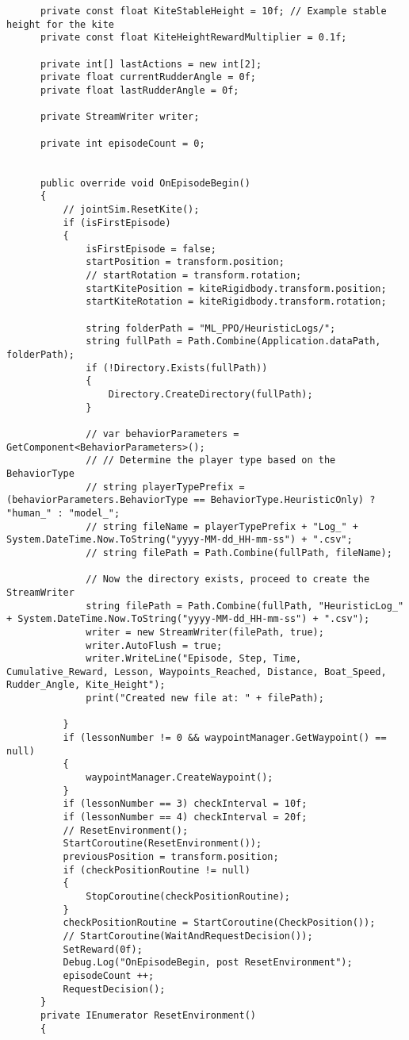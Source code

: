 \begin{lstlisting}
      private const float KiteStableHeight = 10f; // Example stable height for the kite
      private const float KiteHeightRewardMultiplier = 0.1f;
  
      private int[] lastActions = new int[2];
      private float currentRudderAngle = 0f;
      private float lastRudderAngle = 0f;
  
      private StreamWriter writer;
  
      private int episodeCount = 0;
  
  
      public override void OnEpisodeBegin()
      {
          // jointSim.ResetKite();
          if (isFirstEpisode)
          {
              isFirstEpisode = false;
              startPosition = transform.position;
              // startRotation = transform.rotation;
              startKitePosition = kiteRigidbody.transform.position;
              startKiteRotation = kiteRigidbody.transform.rotation;
  
              string folderPath = "ML_PPO/HeuristicLogs/";
              string fullPath = Path.Combine(Application.dataPath, folderPath);
              if (!Directory.Exists(fullPath))
              {
                  Directory.CreateDirectory(fullPath);
              }
  
              // var behaviorParameters = GetComponent<BehaviorParameters>();
              // // Determine the player type based on the BehaviorType
              // string playerTypePrefix = (behaviorParameters.BehaviorType == BehaviorType.HeuristicOnly) ? "human_" : "model_";
              // string fileName = playerTypePrefix + "Log_" + System.DateTime.Now.ToString("yyyy-MM-dd_HH-mm-ss") + ".csv";
              // string filePath = Path.Combine(fullPath, fileName);
  
              // Now the directory exists, proceed to create the StreamWriter
              string filePath = Path.Combine(fullPath, "HeuristicLog_" + System.DateTime.Now.ToString("yyyy-MM-dd_HH-mm-ss") + ".csv");
              writer = new StreamWriter(filePath, true);
              writer.AutoFlush = true;
              writer.WriteLine("Episode, Step, Time, Cumulative_Reward, Lesson, Waypoints_Reached, Distance, Boat_Speed, Rudder_Angle, Kite_Height");
              print("Created new file at: " + filePath);
  
          }
          if (lessonNumber != 0 && waypointManager.GetWaypoint() == null)
          {
              waypointManager.CreateWaypoint();
          }
          if (lessonNumber == 3) checkInterval = 10f;
          if (lessonNumber == 4) checkInterval = 20f;
          // ResetEnvironment();
          StartCoroutine(ResetEnvironment());
          previousPosition = transform.position;
          if (checkPositionRoutine != null)
          {
              StopCoroutine(checkPositionRoutine);
          }
          checkPositionRoutine = StartCoroutine(CheckPosition());
          // StartCoroutine(WaitAndRequestDecision());
          SetReward(0f);
          Debug.Log("OnEpisodeBegin, post ResetEnvironment");
          episodeCount ++;
          RequestDecision();
      }
      private IEnumerator ResetEnvironment() 
      {
  

\end{lstlisting}
